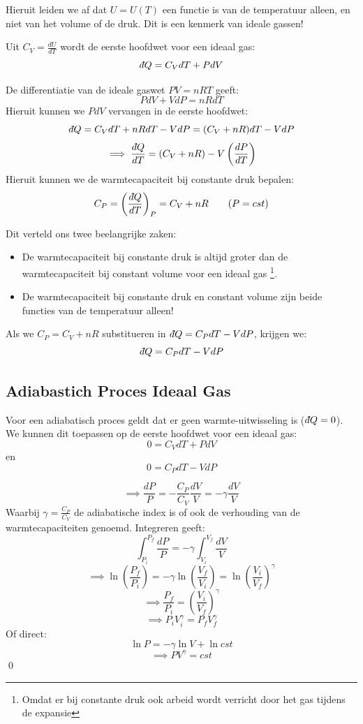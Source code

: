 Hieruit leiden we af dat \(U = U(T)\) een functie is van de temperatuur alleen, en niet van het volume of de druk. Dit is een kenmerk van ideale gassen!

Uit \(C_V = \frac{dU}{dT}\) wordt de eerste hoofdwet voor een ideaal gas:
\begin{equation}
    \label{eq:1e-HW-C_V}
    \dbar Q = C_V dT + PdV
\end{equation}

De differentiatie van de ideale gaswet \(PV = nRT\) geeft:
\[PdV + VdP = nRdT\]
Hieruit kunnen we \(PdV\) vervangen in de eerste hoofdwet:
\[\dbar Q = C_V dT + nRdT - VdP = (C_V + nR) dT - VdP\]
\[\implies \frac{\dbar Q}{dT} = (C_V + nR) - V \left( \frac{dP}{dT} \right)\]
Hieruit kunnen we de warmtecapaciteit bij constante druk bepalen:
\[C_P  = \left( \frac{\dbar Q}{dT} \right)_P = C_V + nR \qquad  (P = cst)\]

Dit verteld ons twee beelangrijke zaken:
\begin{itemize}
    \item De warmtecapaciteit bij constante druk is altijd groter dan de warmtecapaciteit bij constant volume voor een ideaal gas \footnote{Omdat er bij constante druk ook arbeid wordt verricht door het gas tijdens de expansie}.
    \item De warmtecapaciteit bij constante druk en constant volume zijn beide functies van de temperatuur alleen!
\end{itemize}

Als we \(C_P = C_V + nR\) substitueren in \(\dbar Q = C_P dT - VdP\), krijgen we:
\begin{equation}
    \label{eq:1eHW-C_P}
     \dbar Q = C_P dT - VdP
\end{equation}


\subsection{Adiabastich Proces Ideaal Gas}
\begin{derivation}

Voor een adiabatisch proces geldt dat er geen warmte-uitwisseling is (\(\dbar Q = 0\)). We kunnen dit toepassen op de eerste hoofdwet voor een ideaal gas:
\[0 = C_V dT + PdV\]
en
\[0 = C_P dT - VdP\]

\[\implies \frac{dP}{P} = -\frac{C_P}{C_V} \frac{dV}{V} = -\gamma \frac{dV}{V}\]
Waarbij \(\gamma = \frac{C_P}{C_V}\) de adiabatische index is of ook de verhouding van de warmtecapaciteiten genoemd.
Integreren geeft:
\[
\int_{P_i}^{P_f} \frac{dP}{P} = -\gamma \int_{V_i}^{V_f} \frac{dV}{V}
\]
\[\implies \ln \left( \frac{P_f}{P_i} \right) = -\gamma \ln \left( \frac{V_f}{V_i} \right)  = \ln \left( \frac{V_i}{V_f} \right)^\gamma\]
\[\implies \frac{P_f}{P_i} = \left( \frac{V_i}{V_f} \right)^\gamma\]
\[\implies P_i V_i^\gamma = P_f V_f^\gamma\]
Of direct:
\[\ln P = -\gamma \ln V + \ln cst\]
\[\implies  PV^{\gamma} = cst\]
\qed
\end{derivation}

